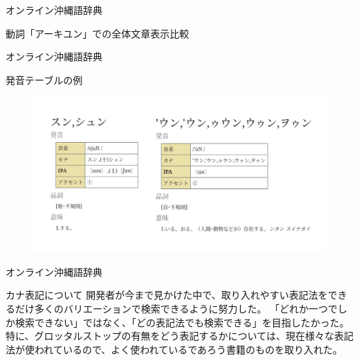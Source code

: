 \documentclass[14pt]{beamer}
\begin{document}
\begin{frame}{オンライン沖縄語辞典}
\begin{block}{動詞「アーキユン」での全体文章表示比較}
\begin{figure}[ht]
\begin{minipage}{0.5\textwidth}
      \end{minipage}
    \end{figure}
  \end{block}
\end{frame}


\begin{frame}{オンライン沖縄語辞典}
  \begin{block}{発音テーブルの例}
    \begin{figure}[ht]
      \centering
        \includegraphics[height=0.6\paperheight,width=0.9\paperwidth]{okinawago-app-pronunciation-example2.png}
    \end{figure}
  \end{block}
\end{frame}

\begin{frame}{オンライン沖縄語辞典}
  \begin{block}{カナ表記について}
    \vspace{0pt}
    開発者が今まで見かけた中で、取り入れやすい表記法をできるだけ多くのバリエーションで検索できるように努力した。
    「どれか一つでしか検索できない」ではなく、「どの表記法でも検索できる」を目指したかった。
    特に、グロッタルストップの有無をどう表記するかについては、現在様々な表記法が使われているので、よく使われているであろう書籍のものを取り入れた。
  \end{block}
\end{frame}
\end{document}
